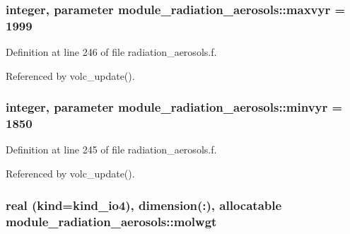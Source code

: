\subsubsection[{\texorpdfstring{maxvyr}{maxvyr}}]{\setlength{\rightskip}{0pt plus 5cm}integer, parameter module\+\_\+radiation\+\_\+aerosols\+::maxvyr = 1999\hspace{0.3cm}{\ttfamily [private]}}\hypertarget{group__module__radiation__aerosols_gad856a3d564ff84043219626759673f27}{}\label{group__module__radiation__aerosols_gad856a3d564ff84043219626759673f27}


Definition at line 246 of file radiation\+\_\+aerosols.\+f.



Referenced by volc\+\_\+update().

\subsubsection[{\texorpdfstring{minvyr}{minvyr}}]{\setlength{\rightskip}{0pt plus 5cm}integer, parameter module\+\_\+radiation\+\_\+aerosols\+::minvyr = 1850\hspace{0.3cm}{\ttfamily [private]}}\hypertarget{group__module__radiation__aerosols_gab37644d8cc2c222af700b86db91f05e7}{}\label{group__module__radiation__aerosols_gab37644d8cc2c222af700b86db91f05e7}


Definition at line 245 of file radiation\+\_\+aerosols.\+f.



Referenced by volc\+\_\+update().

\subsubsection[{\texorpdfstring{molwgt}{molwgt}}]{\setlength{\rightskip}{0pt plus 5cm}real (kind=kind\+\_\+io4), dimension(\+:), allocatable module\+\_\+radiation\+\_\+aerosols\+::molwgt\hspace{0.3cm}{\ttfamily [private]}}\hypertarget{group__module__radiation__aerosols_ga166e63abaa518ec795f8eea6d115f03c}{}\label{group__module__radiation__aerosols_ga166e63abaa518ec795f8eea6d115f03c}


